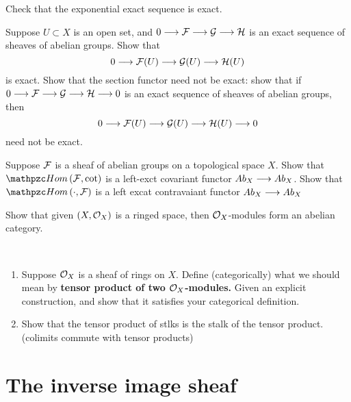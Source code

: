\begin{exr}
Check that the exponential exact sequence is exact.
\end{exr}

\begin{exr}
Suppose $U\subset X$ is an open set, and $0\longrightarrow {\cal F}\longrightarrow {\cal G}\longrightarrow {\cal H}$ is an exact sequence of sheaves of abelian groups. Show that 
$$
0\longrightarrow {\cal F}(U)\longrightarrow{\cal G}(U)\longrightarrow {\cal H}(U)
$$
is exact. Show that the section functor need not be exact: show that if $0\longrightarrow {\cal F}\longrightarrow {\cal G}\longrightarrow {\cal H}\longrightarrow 0$ is an exact sequence of sheaves of abelian groups, then
$$
0\longrightarrow{\cal F}(U)\longrightarrow{\cal G}(U)\longrightarrow{\cal H}(U)\longrightarrow 0
$$
need not be exact.
\end{exr}

\begin{exr}
Suppose ${\cal F}$ is a sheaf of abelian groups on a topological space $X$. Show that $\phom(\calf,\cot) $ is a left-exct covariant functor $Ab_X\longrightarrow Ab_X$. Show that $\phom(\cdot,\calf)$ is a left excat contravaiant functor $Ab_X\longrightarrow Ab_X$
\end{exr}

\begin{exr}
Show that given $(X,{\cal O}_X)$ is a ringed space, then ${\cal O}_X$-modules form an abelian category. 
\end{exr}
\begin{exr}\label{chap2exr:sheaf_section_functor_left_excact}
\ \begin{enumerate}[label=(\alph*)]
\item Suppose ${\cal O}_X$ is a sheaf of rings on $X$. Define (categorically) what we should mean by \textbf{ tensor product of two ${\cal O}_X$-modules.} Given an explicit construction, and show that it satisfies your categorical definition.
\item Show that the tensor product of stlks is the stalk of the tensor product. (colimits commute with tensor products)
\end{enumerate}
\end{exr}
\section{The inverse image sheaf}